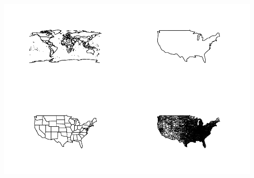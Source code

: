 \documentclass[
]{book}
\begin{document}
\includegraphics{_main_files/figure-latex/unnamed-chunk-244-1.pdf}
\end{document}
